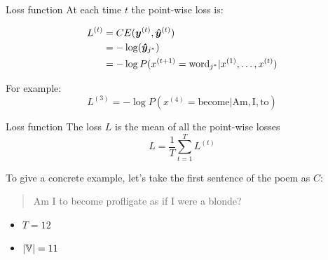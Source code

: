 \documentclass[10pt]{beamer}
\begin{document}
\begin{frame}{Loss function}
At each time $t$ the point-wise loss is:

\vspace{0.2cm}

\begin{align*}
L^{(t)} &= CE(\bm{y}^{(t)},\bm{\hat{y}}^{(t)})\\
		&= - \log(\bm{\hat{y}}_{j^{*}})\\
        &= - \log P(x^{(t+1)} = \text{word}_{j^{*}}|x^{(1)}, \dots, x^{(t)})
\end{align*}

 \vspace{0.2cm}

For example:
\begin{equation*}
L^{(3)}=- \log P(x^{(4)} = \text{become}| \text{Am}, \text{I}, \text{to})
\end{equation*}
\end{frame}


\begin{frame}{Loss function}
The loss $L$ is the mean of all the point-wise losses
\begin{equation*}
L=\frac{1}{T}\sum_{t=1}^{T}L^{(t)}
\end{equation*}

To give a concrete example, let's take the first sentence of the poem as $C$:
\begin{quote}
\alert{Am I to become profligate as if I were a blonde?}
\end{quote}

\begin{itemize}
\item $T = 12$
\item $|\mathbb{V}| = 11$
\end{itemize}

\end{frame}
\end{document}
